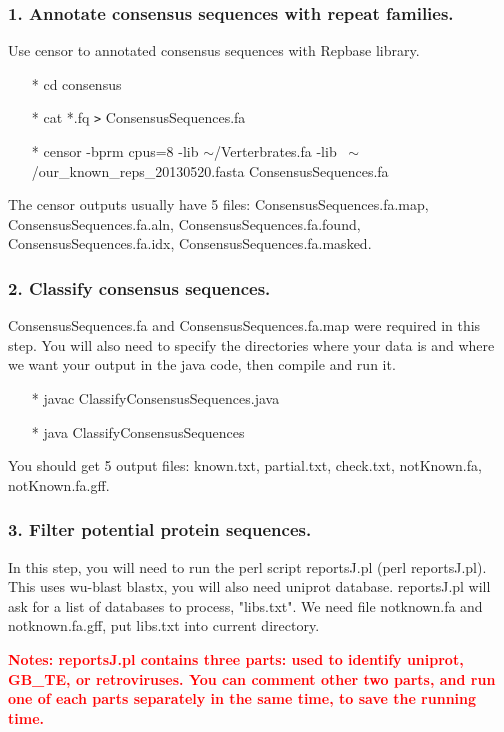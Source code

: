\documentclass[12pt]{report}
\begin{document}
\subsubsection{1. Annotate consensus sequences with repeat families.}
Use censor to annotated consensus sequences with Repbase library. 
\begin{enumerate}
	\item[*] cd consensus
	\item[*] cat *.fq \texttt{>} ConsensusSequences.fa 
	\item[*] censor -bprm cpus=8 -lib $\sim$/Verterbrates.fa -lib ~$\sim$/our\_known\_reps\_20130520.fasta ConsensusSequences.fa 
\end{enumerate}
The censor outputs usually have 5 files: ConsensusSequences.fa.map, ConsensusSequences.fa.aln, ConsensusSequences.fa.found, ConsensusSequences.fa.idx, ConsensusSequences.fa.masked.  \\

\subsubsection{2. Classify consensus sequences.}
ConsensusSequences.fa and ConsensusSequences.fa.map were required in this step. You will also need to specify the directories where your data is and where we want your output in the java code, then compile and run it.\\
\begin{enumerate}
	\item[*] javac ClassifyConsensusSequences.java
	\item[*] java ClassifyConsensusSequences
\end{enumerate}
You should get 5 output files: known.txt, partial.txt, check.txt, notKnown.fa, notKnown.fa.gff.

\subsubsection{3. Filter potential protein sequences.}
In this step, you will need to run the perl script reportsJ.pl (perl reportsJ.pl). This uses wu-blast blastx, you will also need uniprot database. reportsJ.pl will ask for a list of databases to process, "libs.txt". We need file notknown.fa and notknown.fa.gff, put libs.txt into current directory.

\textbf{\textcolor{red}{Notes: reportsJ.pl contains three parts: used to identify uniprot, GB\_TE, or retroviruses. You can comment other two parts, and run one of each parts separately in the same time, to save the running time.}}
\end{document}
